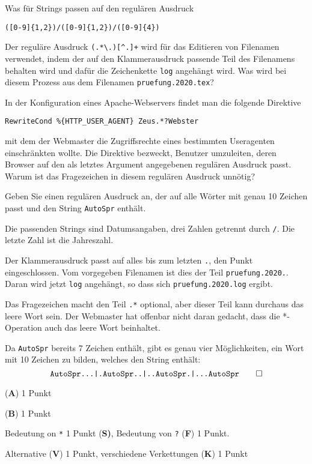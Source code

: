 \begin{teilaufgaben}
\item Was für Strings passen auf den regulären Ausdruck
\begin{verbatim}
([0-9]{1,2})/([0-9]{1,2})/([0-9]{4})
\end{verbatim}
\item
Der reguläre Ausdruck \texttt{(.*\textbackslash.)[\textasciicircum.]+} wird
für das Editieren von Filenamen verwendet, indem der auf den Klammerausdruck
passende Teil des Filenamens behalten wird und dafür die Zeichenkette
\texttt{log} angehängt wird.
Was wird bei diesem Prozess aus dem Filenamen \texttt{pruefung.2020.tex}?
\item
In der Konfiguration eines Apache-Webservers findet man die
folgende Direktive
\begin{verbatim}
RewriteCond %{HTTP_USER_AGENT} Zeus.*?Webster
\end{verbatim}
mit dem der Webmaster die Zugriffsrechte eines bestimmten Useragenten
einschränkten wollte.
Die Direktive bezweckt, Benutzer umzuleiten, deren Browser auf den als
letztes Argument angegebenen regulären Ausdruck passt.
Warum ist das Fragezeichen in diesem regulären Ausdruck unnötig?
\item
Geben Sie einen regulären Ausdruck an, der auf alle Wörter mit genau
10 Zeichen passt und den String \texttt{AutoSpr} enthält.
\end{teilaufgaben}

\begin{loesung}
\begin{teilaufgaben}
\item Die passenden Strings sind Datumsangaben, drei Zahlen getrennt durch
\texttt{/}.
Die letzte Zahl ist die Jahreszahl.
\item Der Klammerausdruck passt auf alles bis zum letzten \texttt{.},
den Punkt eingeschlossen.
Vom vorgegeben Filenamen ist dies der Teil \texttt{pruefung.2020.}.
Daran wird jetzt \texttt{log} angehängt, so dass sich
\texttt{pruefung.2020.log} ergibt.
\item Das Fragezeichen macht den Teil \texttt{.*} optional, aber dieser
Teil kann durchaus das leere Wort sein.
Der Webmaster hat offenbar nicht daran gedacht, dass die *-Operation
auch das leere Wort beinhaltet.
\item Da \texttt{AutoSpr} bereits 7 Zeichen enthält, gibt es genau vier
Möglichkeiten, ein Wort mit 10 Zeichen zu bilden, welches den String
enthält:
\[
\texttt{AutoSpr...|.AutoSpr..|..AutoSpr.|...AutoSpr}
\qedhere
\]
\end{teilaufgaben}
\end{loesung}

\begin{bewertung}
\begin{teilaufgaben}
\item ({\bf A}) 1 Punkt
\item ({\bf B}) 1 Punkt
\item Bedeutung on \texttt{*} 1 Punkt {(\bf S)},
Bedeutung von \texttt{?} ({\bf F}) 1 Punkt.
\item Alternative ({\bf V}) 1 Punkt, verschiedene Verkettungen ({\bf K}) 1 Punkt
\end{teilaufgaben}
\end{bewertung}


